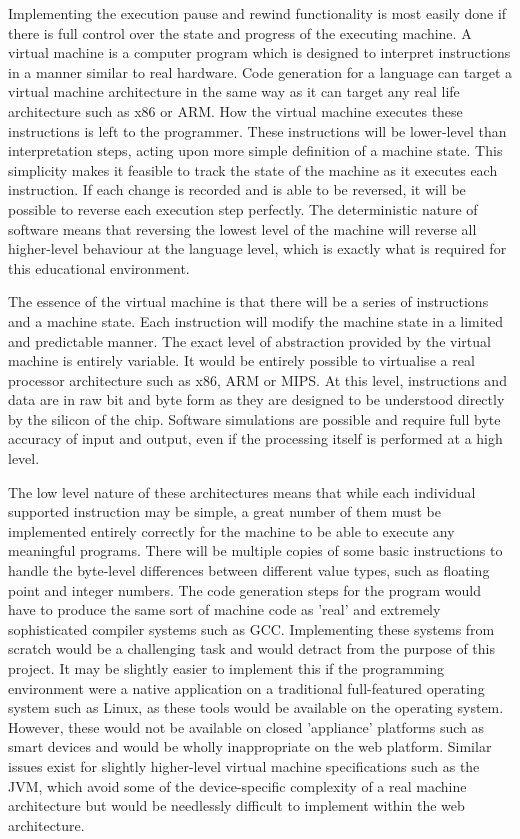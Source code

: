Implementing the execution pause and rewind functionality is most easily done if there is full control over the state and progress of the executing machine. A virtual machine is a computer program which is designed to interpret instructions in a manner similar to real hardware. Code generation for a language can target a virtual machine architecture in the same way as it can target any real life architecture such as x86 or ARM. How the virtual machine executes these instructions is left to the programmer. These instructions will be lower-level than interpretation steps, acting upon more simple definition of a machine state. This simplicity makes it feasible to track the state of the machine as it executes each instruction. If each change is recorded and is able to be reversed, it will be possible to reverse each execution step perfectly. The deterministic nature of software means that reversing the lowest level of the machine will reverse all higher-level behaviour at the language level, which is exactly what is required for this educational environment.

The essence of the virtual machine is that there will be a series of instructions and a machine state. Each instruction will modify the machine state in a limited and predictable manner. The exact level of abstraction provided by the virtual machine is entirely variable. It would be entirely possible to virtualise a real processor architecture such as x86, ARM or MIPS. At this level, instructions and data are in raw bit and byte form as they are designed to be understood directly by the silicon of the chip. Software simulations are possible and require full byte accuracy of input and output, even if the processing itself is performed at a high level.

The low level nature of these architectures means that while each individual supported instruction may be simple, a great number of them must be implemented entirely correctly for the machine to be able to execute any meaningful programs. There will be multiple copies of some basic instructions to handle the byte-level differences between different value types, such as floating point and integer numbers. The code generation steps for the program would have to produce the same sort of machine code as 'real' and extremely sophisticated compiler systems such as GCC. Implementing these systems from scratch would be a challenging task and would detract from the purpose of this project. It may be slightly easier to implement this if the programming environment were a native application on a traditional full-featured operating system such as Linux, as these tools would be available on the operating system. However, these would not be available on closed 'appliance' platforms such as smart devices and would be wholly inappropriate on the web platform. Similar issues exist for slightly higher-level virtual machine specifications such as the JVM, which avoid some of the device-specific complexity of a real machine architecture but would be needlessly difficult to implement within the web architecture.

